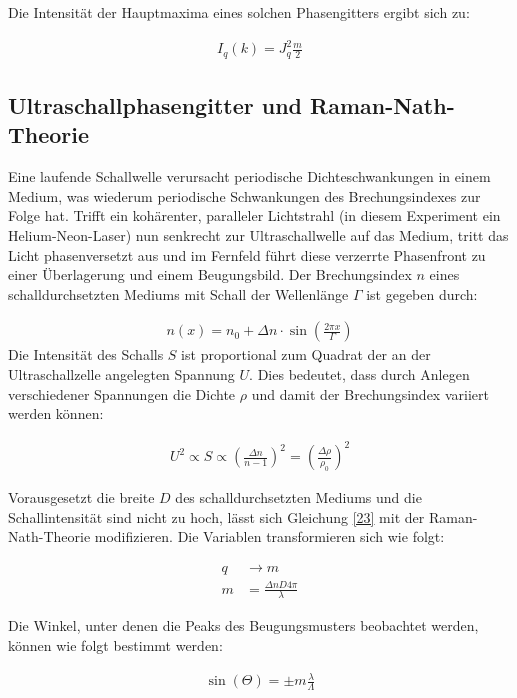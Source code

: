 \documentclass[12pt]{article}
\begin{document}
Die Intensität der Hauptmaxima eines solchen Phasengitters ergibt sich zu:

\begin{align} \label{23}
I_q \left(k \right) = J_q ^2\frac{m}{2}
\end{align}
\subsection{Ultraschallphasengitter und Raman-Nath-Theorie}
\label{Raman-Nath}

Eine laufende Schallwelle verursacht periodische Dichteschwankungen in einem Medium, was wiederum periodische Schwankungen des Brechungsindexes zur Folge hat. Trifft ein kohärenter, paralleler Lichtstrahl (in diesem Experiment ein Helium-Neon-Laser) nun senkrecht zur Ultraschallwelle auf das Medium, tritt das Licht phasenversetzt aus und im Fernfeld führt diese verzerrte Phasenfront zu einer Überlagerung und einem Beugungsbild. Der Brechungsindex $n$ eines schalldurchsetzten Mediums mit Schall der Wellenlänge $\Gamma$ ist gegeben durch:

\begin{align}
n\left(x \right) = n_0 + \Delta n \cdot \sin \left(\frac{2 \pi x}{\Gamma} \right) 
\end{align}
Die Intensität des Schalls $S$ ist proportional zum Quadrat der an der Ultraschallzelle angelegten Spannung $ U$. Dies bedeutet, dass durch Anlegen verschiedener Spannungen die Dichte $\rho$ und damit der Brechungsindex variiert werden können:

\begin{align}
U^2 \propto S \propto \left( \frac{\Delta n}{n -1} \right)^2 = \left( \frac{\Delta \rho}{\rho_0}\right)^2  
\end{align}

Vorausgesetzt die breite $D$ des schalldurchsetzten Mediums und die Schallintensität sind nicht zu hoch, lässt sich Gleichung \ref{23} mit der Raman-Nath-Theorie modifizieren. Die Variablen transformieren sich wie folgt:

\begin{align}
q &\rightarrow m\\
m &= \frac{\Delta n D 4 \pi}{\lambda}
\end{align}

Die Winkel, unter denen die Peaks des Beugungsmusters beobachtet werden, können wie folgt bestimmt werden:

\begin{align}
\sin\left( \Theta\right) = \pm m \frac{\lambda}{\Lambda}
\end{align}
\end{document}
